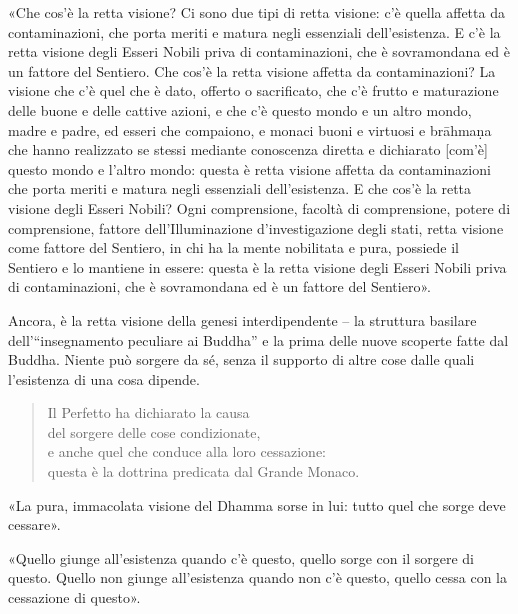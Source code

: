 «Che cos’è la retta visione? Ci sono due tipi di retta visione: c’è
quella affetta da contaminazioni, che porta meriti e matura negli
essenziali dell’esistenza. E c’è la retta visione degli Esseri Nobili
priva di contaminazioni, che è sovramondana ed è un fattore del
Sentiero. Che cos’è la retta visione affetta da contaminazioni? La
visione che c’è quel che è dato, offerto o sacrificato, che c’è frutto e
maturazione delle buone e delle cattive azioni, e che c’è questo mondo e
un altro mondo, madre e padre, ed esseri che compaiono, e monaci buoni e
virtuosi e brāhmaṇa che hanno realizzato se stessi mediante conoscenza
diretta e dichiarato [com’è] questo mondo e l’altro mondo: questa è
retta visione affetta da contaminazioni che porta meriti e matura negli
essenziali dell’esistenza. E che cos’è la retta visione degli Esseri
Nobili? Ogni comprensione, facoltà di comprensione, potere di
comprensione, fattore dell’Illuminazione d’investigazione degli stati,
retta visione come fattore del Sentiero, in chi ha la mente nobilitata e
pura, possiede il Sentiero e lo mantiene in essere: questa è la retta
visione degli Esseri Nobili priva di contaminazioni, che è sovramondana
ed è un fattore del Sentiero».




 Ancora, è la retta visione della genesi
interdipendente – la struttura basilare dell’“insegnamento peculiare ai
Buddha” e la prima delle nuove scoperte fatte dal Buddha. Niente può
sorgere da sé, senza il supporto di altre cose dalle quali l’esistenza
di una cosa dipende.




\begin{quote}
Il Perfetto ha dichiarato la causa \\
del sorgere delle cose condizionate, \\
e anche quel che conduce alla loro cessazione: \\
questa è la dottrina predicata dal Grande Monaco.
\end{quote}

«La pura, immacolata visione del Dhamma sorse in lui: tutto quel che
sorge deve cessare».




 «Quello giunge all’esistenza quando c’è questo, quello sorge
con il sorgere di questo. Quello non giunge all’esistenza quando non c’è
questo, quello cessa con la cessazione di questo».


